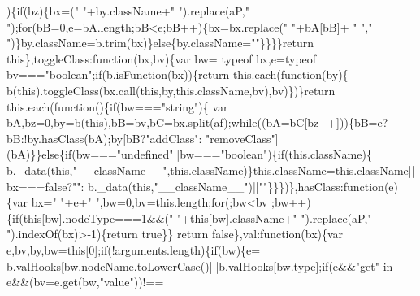 \begin{DoxyCode}
      )\{\textcolor{keywordflow}{if}(bz)\{bx=(\textcolor{stringliteral}{" "}+by.className+\textcolor{stringliteral}{" "}).replace(aP,\textcolor{stringliteral}{" "});\textcolor{keywordflow}{for}(bB=0,e=bA.length;bB<e;bB++)\{bx=bx.replace(\textcolor{stringliteral}{" "}+bA[bB]+\textcolor{stringliteral}{
      " "},\textcolor{stringliteral}{" "})\}by.className=b.trim(bx)\}\textcolor{keywordflow}{else}\{by.className=\textcolor{stringliteral}{""}\}\}\}\}\textcolor{keywordflow}{return} \textcolor{keyword}{this}\},toggleClass:\textcolor{keyword}{function}(bx,bv)\{var bw=
      typeof bx,e=typeof bv===\textcolor{stringliteral}{"boolean"};\textcolor{keywordflow}{if}(b.isFunction(bx))\{\textcolor{keywordflow}{return} this.each(\textcolor{keyword}{function}(by)\{
      b(\textcolor{keyword}{this}).toggleClass(bx.call(\textcolor{keyword}{this},by,\textcolor{keyword}{this}.className,bv),bv)\})\}\textcolor{keywordflow}{return} this.each(\textcolor{keyword}{function}()\{\textcolor{keywordflow}{if}(bw===\textcolor{stringliteral}{"string"})\{
      var bA,bz=0,by=b(\textcolor{keyword}{this}),bB=bv,bC=bx.split(af);\textcolor{keywordflow}{while}((bA=bC[bz++]))\{bB=e?bB:!by.hasClass(bA);by[bB?\textcolor{stringliteral}{"addClass"}:\textcolor{stringliteral}{
      "removeClass"}](bA)\}\}\textcolor{keywordflow}{else}\{\textcolor{keywordflow}{if}(bw===\textcolor{stringliteral}{"undefined"}||bw===\textcolor{stringliteral}{"boolean"})\{\textcolor{keywordflow}{if}(this.className)\{
      b.\_data(\textcolor{keyword}{this},\textcolor{stringliteral}{"\_\_className\_\_"},this.className)\}this.className=this.className||bx===\textcolor{keyword}{false}?\textcolor{stringliteral}{""}:
      b.\_data(\textcolor{keyword}{this},\textcolor{stringliteral}{"\_\_className\_\_"})||\textcolor{stringliteral}{""}\}\}\})\},hasClass:\textcolor{keyword}{function}(e)\{var bx=\textcolor{stringliteral}{" "}+e+\textcolor{stringliteral}{" "},bw=0,bv=this.length;\textcolor{keywordflow}{for}(;bw<bv
      ;bw++)\{\textcolor{keywordflow}{if}(\textcolor{keyword}{this}[bw].nodeType===1&&(\textcolor{stringliteral}{" "}+\textcolor{keyword}{this}[bw].className+\textcolor{stringliteral}{" "}).replace(aP,\textcolor{stringliteral}{" "}).indexOf(bx)>-1)\{\textcolor{keywordflow}{return} \textcolor{keyword}{true}\}\}\textcolor{keywordflow}{
      return} \textcolor{keyword}{false}\},val:\textcolor{keyword}{function}(bx)\{var e,bv,by,bw=\textcolor{keyword}{this}[0];\textcolor{keywordflow}{if}(!arguments.length)\{\textcolor{keywordflow}{if}(bw)\{e=
      b.valHooks[bw.nodeName.toLowerCase()]||b.valHooks[bw.type];\textcolor{keywordflow}{if}(e&&\textcolor{stringliteral}{"get"} in e&&(bv=e.get(bw,\textcolor{stringliteral}{"value"}))!==

\end{DoxyCode}
